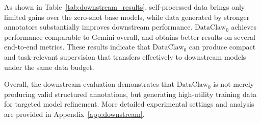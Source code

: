 As shown in Table~\ref{tab:downstream_results}, self-processed data brings only limited gains over the zero-shot base models, while data generated by stronger annotators substantially improves downstream performance. $\text{DataClaw}_0$ achieves performance comparable to Gemini overall, and obtains better results on several end-to-end metrics. These results indicate that $\text{DataClaw}_0$ can produce compact and task-relevant supervision that transfers effectively to downstream models under the same data budget.

Overall, the downstream evaluation demonstrates that $\text{DataClaw}_0$ is not merely producing valid structured annotations, but generating high-utility training data for targeted model refinement. More detailed experimental settings and analysis are provided in Appendix~\ref{app:downstream}.




